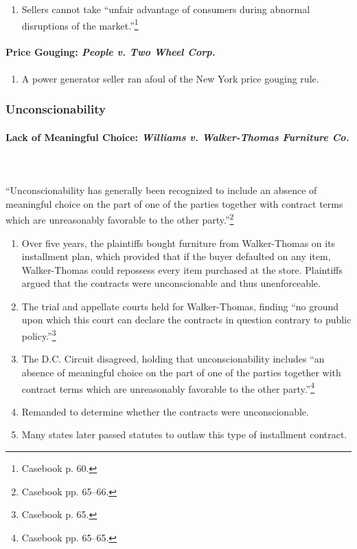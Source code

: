 \begin{enumerate}
    \item Sellers cannot take ``unfair advantage of consumers during abnormal 
    disruptions of the market.''\footnote{Casebook p. 60.}
\end{enumerate}

\paragraph{Price Gouging: \emph{People v. Two Wheel Corp.}}

\begin{enumerate}
    \item A power generator seller ran afoul of the New York price gouging 
    rule.
\end{enumerate}

\subsubsection{Unconscionability}

\paragraph{Lack of Meaningful Choice: \emph{Williams v. Walker-Thomas 
Furniture Co.}}
~\\\\
``Unconscionability has generally been recognized to include an absence of 
meaningful choice on the part of one of the parties together with contract 
terms which are unreasonably favorable to the other party.''\footnote{Casebook 
pp. 65--66.}
\begin{enumerate}
    \item Over five years, the plaintiffs bought furniture from Walker-Thomas 
    on its installment plan, which provided that if the buyer defaulted on any 
    item, Walker-Thomas could repossess every item purchased at the store. 
    Plaintiffs argued that the contracts were unconscionable and thus 
    unenforceable.
    \item The trial and appellate courts held for Walker-Thomas, finding ``no 
    ground upon which this court can declare the contracts in question 
    contrary to public policy.''\footnote{Casebook p. 65.}
    \item The D.C. Circuit disagreed, holding that unconscionability includes 
    ``an absence of meaningful choice on the part of one of the parties 
    together with contract terms which are unreasonably favorable to the other 
    party.''\footnote{Casebook pp. 65--65.}
    \item Remanded to determine whether the contracts were unconscionable.
    \item Many states later passed statutes to outlaw this type of installment 
    contract.
\end{enumerate}
 
